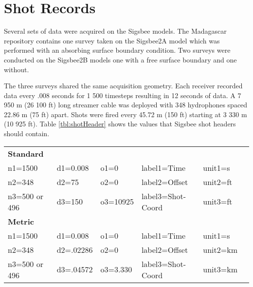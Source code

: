 
\section{Shot Records}
Several sets of data were acquired on the Sigsbee models.  The Madagascar repository contains one survey taken on the 
Sigsbee2A model which was performed with an absorbing surface boundary condition.  Two surveys were conducted on the Sigsbee2B  
models one with a free surface boundary and one without.  

The three surveys shared the same acquisition geometry.  Each receiver recorded data every .008 seconds for 1 500 timesteps resulting 
in 12 seconds of data.  A 7 950 m (26 100 ft) long streamer cable was deployed with 348 hydrophones spaced 22.86 m (75 ft) apart.  Shots were fired
every 45.72 m (150 ft) starting at 3 330 m  (10 925 ft).  Table \ref{tbl:shotHeader} shows the values that Sigsbee shot headers should contain.  

{
\begin{tabular}[t]{|llllll|}
        \hline 
	\textbf{Standard}    &  &           &                       &              &  \\
        n1=1500  &   d1=0.008	&  o1=0     &    label1=Time        &   unit1=s    &  \\
	n2=348	 &   d2=75 	&  o2=0     &    label2=Offset      &   unit2=ft   &  \\
	n3=500 or 496   &   d3=150     &  o3=10925 &    label3=Shot-Coord  &   unit3=ft   &  \\
	\textbf{Metric}      &  &           &                       &              &  \\
        n1=1500  &   d1=0.008	&  o1=0     &    label1=Time        &   unit1=s    &  \\
	n2=348	 &   d2=.02286 	&  o2=0     &    label2=Offset      &   unit2=km   &  \\
	n3=500 or 496   &   d3=.04572     &  o3=3.330 &    label3=Shot-Coord  &   unit3=km   &  \\
        \hline
\end{tabular}
}

